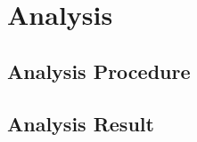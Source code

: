 
\chapter{Analysis}
\label{analysis_chapter}

\section{Analysis Procedure}
\label{anaproc}

\section{Analysis Result}
\label{neymanana}
